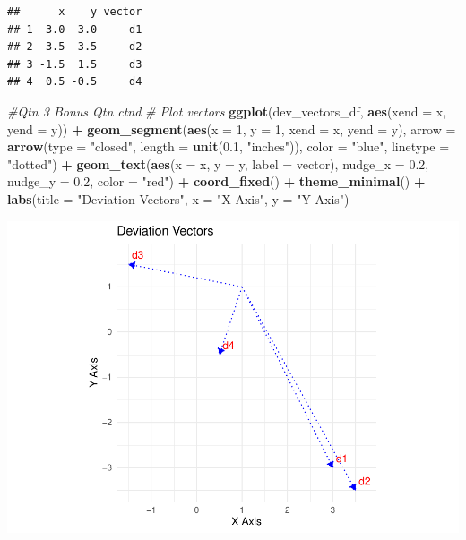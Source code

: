\documentclass[
]{article}
\newenvironment{Shaded}{\begin{snugshade}}{\end{snugshade}}
\newcommand{\AttributeTok}[1]{\textcolor[rgb]{0.13,0.29,0.53}{#1}}
\newcommand{\CommentTok}[1]{\textcolor[rgb]{0.56,0.35,0.01}{\textit{#1}}}
\newcommand{\DecValTok}[1]{\textcolor[rgb]{0.00,0.00,0.81}{#1}}
\newcommand{\FloatTok}[1]{\textcolor[rgb]{0.00,0.00,0.81}{#1}}
\newcommand{\FunctionTok}[1]{\textcolor[rgb]{0.13,0.29,0.53}{\textbf{#1}}}
\newcommand{\NormalTok}[1]{#1}
\newcommand{\SpecialCharTok}[1]{\textcolor[rgb]{0.81,0.36,0.00}{\textbf{#1}}}
\newcommand{\StringTok}[1]{\textcolor[rgb]{0.31,0.60,0.02}{#1}}
\begin{document}
\begin{verbatim}
##      x    y vector
## 1  3.0 -3.0     d1
## 2  3.5 -3.5     d2
## 3 -1.5  1.5     d3
## 4  0.5 -0.5     d4
\end{verbatim}

\begin{Shaded}
\begin{Highlighting}[]
\CommentTok{\#Qtn 3 Bonus Qtn ctnd}
\CommentTok{\# Plot vectors}
\FunctionTok{ggplot}\NormalTok{(dev\_vectors\_df, }\FunctionTok{aes}\NormalTok{(}\AttributeTok{xend =}\NormalTok{ x, }\AttributeTok{yend =}\NormalTok{ y)) }\SpecialCharTok{+}
  \FunctionTok{geom\_segment}\NormalTok{(}\FunctionTok{aes}\NormalTok{(}\AttributeTok{x =} \DecValTok{1}\NormalTok{, }\AttributeTok{y =} \DecValTok{1}\NormalTok{, }\AttributeTok{xend =}\NormalTok{ x, }\AttributeTok{yend =}\NormalTok{ y), }
               \AttributeTok{arrow =} \FunctionTok{arrow}\NormalTok{(}\AttributeTok{type =} \StringTok{"closed"}\NormalTok{, }\AttributeTok{length =} \FunctionTok{unit}\NormalTok{(}\FloatTok{0.1}\NormalTok{, }\StringTok{"inches"}\NormalTok{)),}
               \AttributeTok{color =} \StringTok{"blue"}\NormalTok{,}
               \AttributeTok{linetype =} \StringTok{"dotted"}\NormalTok{) }\SpecialCharTok{+}
  \FunctionTok{geom\_text}\NormalTok{(}\FunctionTok{aes}\NormalTok{(}\AttributeTok{x =}\NormalTok{ x, }\AttributeTok{y =}\NormalTok{ y, }\AttributeTok{label =}\NormalTok{ vector), }\AttributeTok{nudge\_x =} \FloatTok{0.2}\NormalTok{, }\AttributeTok{nudge\_y =} \FloatTok{0.2}\NormalTok{, }\AttributeTok{color =} \StringTok{"red"}\NormalTok{) }\SpecialCharTok{+}
  \FunctionTok{coord\_fixed}\NormalTok{() }\SpecialCharTok{+} 
  \FunctionTok{theme\_minimal}\NormalTok{() }\SpecialCharTok{+}
  \FunctionTok{labs}\NormalTok{(}\AttributeTok{title =} \StringTok{"Deviation Vectors"}\NormalTok{, }\AttributeTok{x =} \StringTok{"X Axis"}\NormalTok{, }\AttributeTok{y =} \StringTok{"Y Axis"}\NormalTok{)}
\end{Highlighting}
\end{Shaded}

\includegraphics{CA1_files/figure-latex/unnamed-chunk-9-1.pdf}
\end{document}
